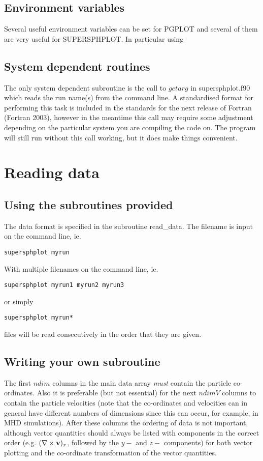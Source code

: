 \documentclass[a4paper,12pt]{article}
\begin{document}
\subsection{Environment variables}
 Several useful environment variables can be set for PGPLOT and several of them
are very useful for SUPERSPHPLOT. In particular using

\subsection{System dependent routines}
The only system dependent subroutine is the call to $getarg$ in supersphplot.f90 which
reads the run name(s) from the command line. A standardised format for performing this
task is included in the standards for the next release of Fortran (Fortran 2003),
however in the meantime this call may require some adjustment depending on the
particular system you are compiling the code on. The program will still run without
this call working, but it does make things convenient.

\section{Reading data}

\subsection{Using the subroutines provided}
 The data format is specified in the subroutine read\_data.  
The filename is input on the command line, ie.
\begin{verbatim}
supersphplot myrun
\end{verbatim}
With multiple filenames on the command line, ie.
\begin{verbatim}
supersphplot myrun1 myrun2 myrun3
\end{verbatim}
or simply
\begin{verbatim}
supersphplot myrun*
\end{verbatim}
files will be read consecutively in the order that they are given.

\subsection{Writing your own subroutine}
The first $ndim$ columns in the main data array \emph{must} contain the particle co-ordinates.
Also it is preferable (but not essential) for the next $ndimV$ columns to contain the
particle velocities (note that the co-ordinates and velocities can in general have different
numbers of dimensions since this can occur, for example, in MHD simulations). After
these columns the ordering of data is not important, although vector quantities should
always be listed with components in the correct order (e.g. $(\nabla\times {\bf v})_x$,
followed by the $y-$ and $z-$ components) for both vector plotting and the co-ordinate
transformation of the vector quantities. 
\end{document}
